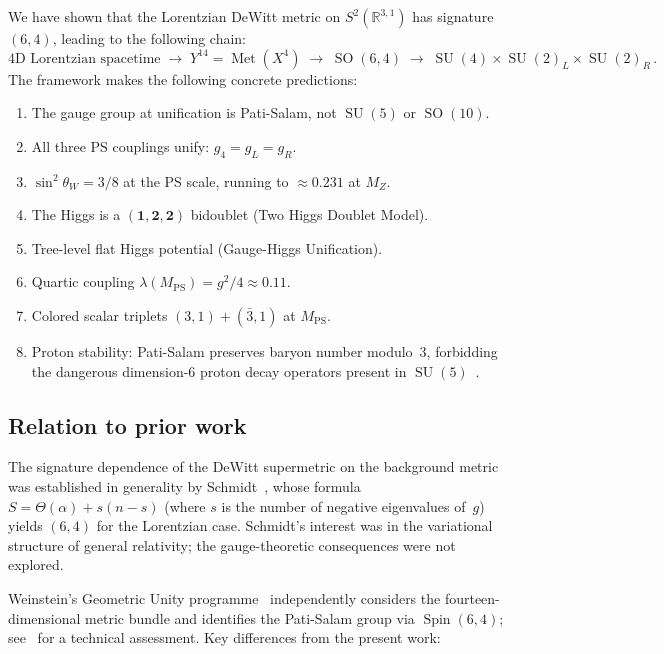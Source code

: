 \documentclass[12pt,a4paper]{article}
\theoremstyle{definition}
\newcommand{\Met}{\operatorname{Met}}
\newcommand{\SO}{\operatorname{SO}}
\newcommand{\SU}{\operatorname{SU}}
\newcommand{\Spin}{\operatorname{Spin}}
\newcommand{\R}{\mathbb{R}}
\begin{document}
We have shown that the Lorentzian DeWitt metric on $S^2(\R^{3,1})$ has signature~$(6,4)$, leading to the following chain:
\begin{equation*}
\text{4D Lorentzian spacetime} \;\to\; Y^{14} = \Met(X^4) \;\to\; \SO(6,4) \;\to\; \SU(4) \times \SU(2)_L \times \SU(2)_R\,.
\end{equation*}
The framework makes the following concrete predictions:
\begin{enumerate}[nosep]
\item The gauge group at unification is Pati-Salam, not $\SU(5)$ or $\SO(10)$.
\item All three PS couplings unify: $g_4 = g_L = g_R$.
\item $\sin^2\theta_W = 3/8$ at the PS scale, running to $\approx 0.231$ at $M_Z$.
\item The Higgs is a $(\mathbf{1},\mathbf{2},\mathbf{2})$ bidoublet (Two Higgs Doublet Model).
\item Tree-level flat Higgs potential (Gauge-Higgs Unification).
\item Quartic coupling $\lambda(M_{\mathrm{PS}}) = g^2/4 \approx 0.11$.
\item Colored scalar triplets $(3,1) + (\bar{3},1)$ at $M_{\mathrm{PS}}$.
\item Proton stability: Pati-Salam preserves baryon number modulo~3, forbidding the dangerous dimension-6 proton decay operators present in $\SU(5)$~\cite{PatiSalam1974}.
\end{enumerate}

\subsection{Relation to prior work}

The signature dependence of the DeWitt supermetric on the background metric was established in generality by Schmidt~\cite{Schmidt1989}, whose formula $S = \Theta(\alpha) + s(n-s)$ (where $s$ is the number of negative eigenvalues of~$g$) yields $(6,4)$ for the Lorentzian case.
Schmidt's interest was in the variational structure of general relativity; the gauge-theoretic consequences were not explored.

Weinstein's Geometric Unity programme~\cite{Weinstein2013,Weinstein2021} independently considers the fourteen-dimensional metric bundle and identifies the Pati-Salam group via $\Spin(6,4)$; see~\cite{NguyenPolya2021} for a technical assessment.
Key differences from the present work:
\end{document}
